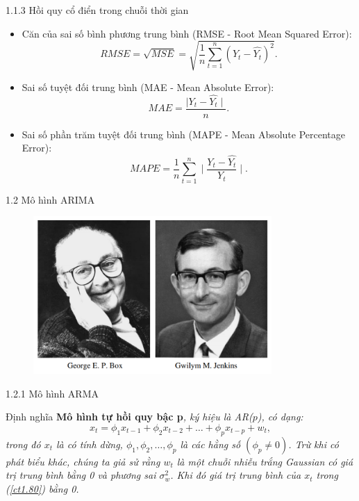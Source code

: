 \documentclass[notheorems,envcountsect,hyperref=unicode]{beamer}
\begin{document}
\begin{frame}{1.1.3 Hồi quy cổ điển trong chuỗi thời gian}
	\begin{itemize}
		\item Căn của sai số bình phương trung bình (RMSE - Root Mean Squared Error):
		$$RMSE=\sqrt{MSE}=\sqrt{\frac{1}{n}\sum_{t=1}^{n}(Y_t-\hat{Y_t})^2}.$$	
		\item Sai số  tuyệt đối trung bình  (MAE - Mean Absolute Error): 
		$$ MAE=\dfrac{\mid Y_t-\hat{Y_t}\mid}{n}.$$	
		\item Sai số phần trăm tuyệt đối trung bình (MAPE - Mean Absolute Percentage Error): 
		$$MAPE=\frac{1}{n}\sum_{t=1}^{n}\mid\dfrac{ Y_t-\hat{Y_t}}{Y_t}\mid.$$
	\end{itemize}
\end{frame}

\begin{frame}{1.2 Mô hình ARIMA}
	\begin{figure}[!h]
		\centering
		\includegraphics[width=1\linewidth,height=6cm]{box1}  
		\vskip-4mm
	\end{figure}
\end{frame}

\begin{frame}{1.2.1 Mô hình ARMA}
	\begin{block}{Định nghĩa \cite{1}}
	\textbf{Mô hình tự hồi quy bậc p}\textit{, ký hiệu là AR($p$), có dạng:
	\begin{equation}
	x_{t} = \phi_{1}x_{t-1} + \phi_{2}x_{t-2} + \dots+ \phi_{p}x_{t-p}+ w_{t}, \label{ct1.80}
	\end{equation}	
	trong đó $x_{t}$ là có tính dừng, $\phi_{1}, \phi_{2}, \dots, \phi_{p}$ là các hằng số $(\phi_{p} \neq 0)$. Trừ khi có phát biểu khác, chúng ta giả sử rằng $w_{t}$ là một chuỗi nhiễu trắng Gaussian có giá trị trung bình bằng 0 và phương sai $\sigma^{2}_w$. Khi đó giá trị trung bình của $x_t$ trong (\ref{ct1.80}) bằng 0.}
	\end{block}
\end{frame}
\end{document}
